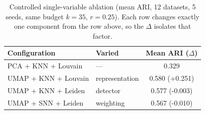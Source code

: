 \begin{table}[htbp]
\centering
\caption{Controlled single-variable ablation (mean ARI, 12 datasets, 5 seeds, same budget $k{=}35$, $r{=}0.25$). Each row changes exactly one component from the row above, so the $\Delta$ isolates that factor.}
\label{tab:controlled}
\footnotesize
\begin{tabular}{llc}
\toprule
Configuration & Varied & Mean ARI ($\Delta$) \\
\midrule
PCA + KNN + Louvain & --- & 0.329 \\
UMAP + KNN + Louvain & representation & 0.580 (+0.251) \\
UMAP + KNN + Leiden & detector & 0.577 (-0.003) \\
UMAP + SNN + Leiden & weighting & 0.567 (-0.010) \\
\bottomrule
\end{tabular}
\end{table}
